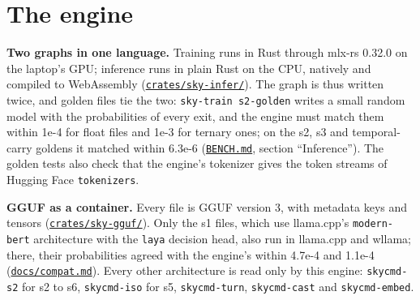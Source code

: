\documentclass[10pt]{article}
\begin{document}
\section{The engine}\label{sec:7}

\textbf{Two graphs in one language.} Training runs in Rust through mlx-rs 0.32.0 on the laptop's GPU; inference runs in plain Rust on the CPU, natively and compiled to WebAssembly (\href{https://github.com/maxgfr/skycmd/tree/main/crates/sky-infer}{\texttt{crates/\allowbreak{}sky-infer/\allowbreak{}}}). The graph is thus written twice, and golden files tie the two: \texttt{sky-train s2-golden} writes a small random model with the probabilities of every exit, and the engine must match them within 1e-4 for float files and 1e-3 for ternary ones; on the s2, s3 and temporal-carry goldens it matched within 6.3e-6 (\href{https://github.com/maxgfr/skycmd/blob/main/BENCH.md}{\texttt{BENCH.md}}, section ``Inference''). The golden tests also check that the engine's tokenizer gives the token streams of Hugging Face \texttt{tokenizers}.

\textbf{GGUF as a container.} Every file is GGUF version 3, with metadata keys and tensors (\href{https://github.com/maxgfr/skycmd/tree/main/crates/sky-gguf}{\texttt{crates/\allowbreak{}sky-gguf/\allowbreak{}}}). Only the s1 files, which use llama.cpp's \texttt{modern-bert} architecture with the \texttt{laya} decision head, also run in llama.cpp and wllama; there, their probabilities agreed with the engine's within 4.7e-4 and 1.1e-4 (\href{https://github.com/maxgfr/skycmd/blob/main/docs/compat.md}{\texttt{docs/\allowbreak{}compat.md}}). Every other architecture is read only by this engine: \texttt{skycmd-s2} for s2 to s6, \texttt{skycmd-iso} for s5, \texttt{skycmd-turn}, \texttt{skycmd-cast} and \texttt{skycmd-embed}.
\end{document}
